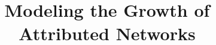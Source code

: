 \documentclass[sigconf]{acmart}
\begin{document}
\title{Modeling the Growth of Attributed Networks}


\renewcommand{\shortauthors}{Anonymous et al.}
\begin{abstract}

\end{abstract}

%
%
%
%


\maketitle





% 



% 
\end{document}
